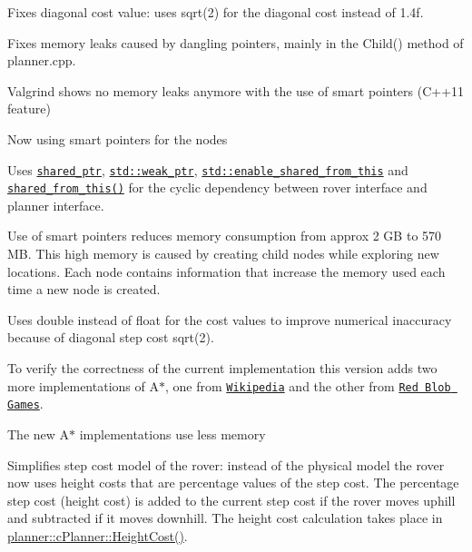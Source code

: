 \begin{DoxyItemize}
\item Fixes diagonal cost value\+: uses sqrt(2) for the diagonal cost instead of 1.\+4f.
\item Fixes memory leaks caused by dangling pointers, mainly in the Child() method of planner.\+cpp.
\begin{DoxyItemize}
\item Valgrind shows no memory leaks anymore with the use of smart pointers (C++11 feature)
\item Now using smart pointers for the nodes
\item Uses \href{https://en.cppreference.com/w/cpp/memory/shared_ptr}{\tt shared\+\_\+ptr}, \href{http://en.cppreference.com/w/cpp/memory/weak_ptr}{\tt std\+::weak\+\_\+ptr}, \href{http://en.cppreference.com/w/cpp/memory/enable_shared_from_this}{\tt std\+::enable\+\_\+shared\+\_\+from\+\_\+this} and \href{https://en.cppreference.com/w/cpp/memory/enable_shared_from_this/shared_from_this}{\tt shared\+\_\+from\+\_\+this()} for the cyclic dependency between rover interface and planner interface.
\item Use of smart pointers reduces memory consumption from approx 2 GB to 570 MB. This high memory is caused by creating child nodes while exploring new locations. Each node contains information that increase the memory used each time a new node is created.
\end{DoxyItemize}
\item Uses double instead of float for the cost values to improve numerical inaccuracy because of diagonal step cost sqrt(2).
\item To verify the correctness of the current implementation this version adds two more implementations of A$\ast$, one from \href{https://en.wikipedia.org/wiki/A*_search_algorithm#Pseudocode}{\tt Wikipedia} and the other from \href{https://www.redblobgames.com/pathfinding/a-star/implementation.html#cpp-astar}{\tt Red Blob Games}.
\item The new A$\ast$ implementations use less memory
\item Simplifies step cost model of the rover\+: instead of the physical model the rover now uses height costs that are percentage values of the step cost. The percentage step cost (height cost) is added to the current step cost if the rover moves uphill and subtracted if it moves downhill. The height cost calculation takes place in \mbox{\hyperlink{classplanner_1_1c_planner_a9d57a0697bb0e4666f4fd45f77c4a1aa}{planner\+::c\+Planner\+::\+Height\+Cost()}}.

\end{DoxyItemize}

